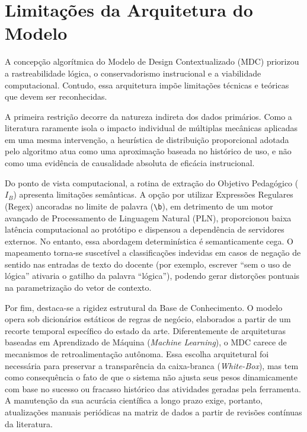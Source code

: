 \section{Limitações da Arquitetura do Modelo}

A concepção algorítmica do Modelo de Design Contextualizado (MDC) priorizou a rastreabilidade lógica, o conservadorismo instrucional e a viabilidade computacional. Contudo, essa arquitetura impõe limitações técnicas e teóricas que devem ser reconhecidas.

A primeira restrição decorre da natureza indireta dos dados primários. Como a literatura raramente isola o impacto individual de múltiplas mecânicas aplicadas em uma mesma intervenção, a heurística de distribuição proporcional adotada pelo algoritmo atua como uma aproximação baseada no histórico de uso, e não como uma evidência de causalidade absoluta de eficácia instrucional.

Do ponto de vista computacional, a rotina de extração do Objetivo Pedagógico ($I_B$) apresenta limitações semânticas. A opção por utilizar Expressões Regulares (Regex) ancoradas no limite de palavra (\verb|\b|), em detrimento de um motor avançado de Processamento de Linguagem Natural (PLN), proporcionou baixa latência computacional ao protótipo e dispensou a dependência de servidores externos. No entanto, essa abordagem determinística é semanticamente cega. O mapeamento torna-se suscetível a classificações indevidas em casos de negação de sentido nas entradas de texto do docente (por exemplo, escrever ``sem o uso de lógica'' ativaria o gatilho da palavra ``lógica''), podendo gerar distorções pontuais na parametrização do vetor de contexto.

Por fim, destaca-se a rigidez estrutural da Base de Conhecimento. O modelo opera sob dicionários estáticos de regras de negócio, elaborados a partir de um recorte temporal específico do estado da arte. Diferentemente de arquiteturas baseadas em Aprendizado de Máquina (\textit{Machine Learning}), o MDC carece de mecanismos de retroalimentação autônoma. Essa escolha arquitetural foi necessária para preservar a transparência da caixa-branca (\textit{White-Box}), mas tem como consequência o fato de que o sistema não ajusta seus pesos dinamicamente com base no sucesso ou fracasso histórico das atividades geradas pela ferramenta. A manutenção da sua acurácia científica a longo prazo exige, portanto, atualizações manuais periódicas na matriz de dados a partir de revisões contínuas da literatura.




